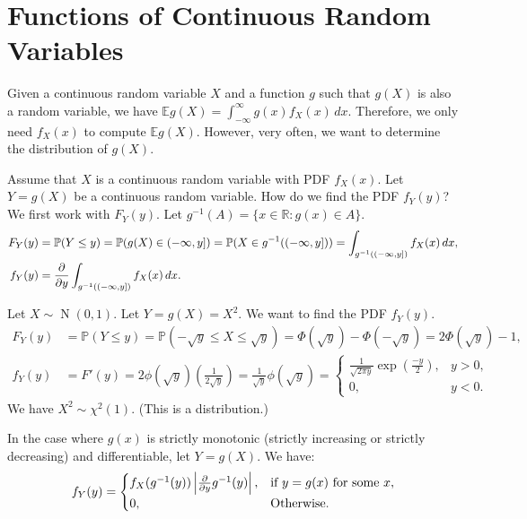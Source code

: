 \documentclass{huhtakm-template-book-v2}
\newcommand{\prob}{\mathbb{P}}
\newcommand{\expect}{\mathbb{E}}
\DeclareMathOperator{\N}{N}
\begin{document}
\section{Functions of Continuous Random Variables}
    Given a continuous random variable $X$ and a function $g$ such that $g(X)$ is also a random variable, we have $\expect{g(X)} = \int_{-\infty}^{\infty} g(x)f_{X}(x)\,dx$. Therefore, we only need $f_{X}(x)$ to compute $\expect{g(X)}$. However, very often, we want to determine the distribution of $g(X)$.
    \begin{eg}
        Assume that $X$ is a continuous random variable with PDF $f_{X}(x)$. Let $Y = g(X)$ be a continuous random variable. How do we find the PDF $f_{Y}(y)$? We first work with $F_{Y}(y)$. Let $g^{-1}(A) = \{x \in \mathbb{R}:g(x) \in A\}$.
        \begin{align*}
            F_{Y}(y) &= \prob(Y \leq y) = \prob(g(X) \in (-\infty,y]) = \prob(X \in g^{-1}((-\infty,y])) = \int_{g^{-1}((-\infty,y])}f_{X}(x)\,dx,\\
            f_{Y}(y) &= \pdv*{\int_{g^{-1}((-\infty,y])}f_{X}(x)\,dx}{y}.
        \end{align*}
    \end{eg}
    \begin{eg}
        Let $X \sim \N(0,1)$. Let $Y = g(X) = X^{2}$. We want to find the PDF $f_{Y}(y)$.
        \begin{align*}
            F_{Y}(y) &= \prob(Y \leq y) = \prob(-\sqrt{y} \leq X \leq \sqrt{y}) = \Phi(\sqrt{y})-\Phi(-\sqrt{y}) = 2\Phi(\sqrt{y})-1,\\
            f_{Y}(y) &= F'(y) = 2\phi(\sqrt{y})\left(\frac{1}{2\sqrt{y}}\right) = \frac{1}{\sqrt{y}}\phi(\sqrt{y}) = \begin{cases}
                \frac{1}{\sqrt{2\pi y}}\exp\left(\frac{-y}{2}\right), &y > 0,\\
                0, &y < 0.
            \end{cases}
        \end{align*}
        We have $X^{2} \sim \chi^{2}(1)$. (This is a distribution.)
    \end{eg}
    \begin{thm}
        In the case where $g(x)$ is strictly monotonic (strictly increasing or strictly decreasing) and differentiable, let $Y = g(X)$. We have:
        \begin{equation*}
            f_{Y}(y) = \begin{cases}
                f_{X}(g^{-1}(y))\left|{\pdv*{g^{-1}(y)}{y}}\right|, &\text{if }y = g(x)\text{ for some }x,\\
                0, &\text{Otherwise}.
            \end{cases}
        \end{equation*}
    \end{thm}
\end{document}
